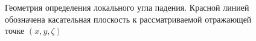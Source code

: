 



\begin{figure}[h!]
    \centering
    \def\svgwidth{0.75\linewidth}
    
    \caption{Геометрия определения локального угла падения. Красной линией
    обозначена касательная плоскость к рассматриваемой отражающей точке
$(x,y,\zeta)$}
    \label{fig:local_theta}
\end{figure}

